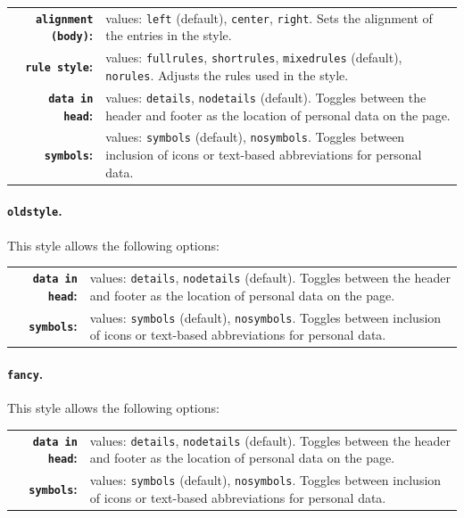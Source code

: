 \documentclass[a4paper, 11pt]{article}
\newcommand{\code}[1]{\lstinline!#1!}
\begin{document}
\begin{tabular}{r@{\hspace{2ex}}p{}}
  \textbf{\code{alignment (body)}:} & values: \code{left} (default), \code{center}, \code{right}.
  Sets the alignment of the entries in the style. \\
  \textbf{\code{rule style}:}       & values: \code{fullrules}, \code{shortrules}, \code{mixedrules} (default), \code{norules}.
  Adjusts the rules used in the style. \\
  \textbf{\code{data in head}:}     & values: \code{details}, \code{nodetails} (default).
  Toggles between the header and footer as the location of personal data on the page. \\
  \textbf{\code{symbols}:}          & values: \code{symbols} (default), \code{nosymbols}.
  Toggles between inclusion of icons or text-based abbreviations for personal data.
\end{tabular}

\paragraph{\code{oldstyle}.}
This style allows the following options:

\begin{tabular}{r@{\hspace{2ex}}p{}}
  \textbf{\code{data in head}:} & values: \code{details}, \code{nodetails} (default).
  Toggles between the header and footer as the location of personal data on the page. \\
  \textbf{\code{symbols}:}      & values: \code{symbols} (default), \code{nosymbols}.
  Toggles between inclusion of icons or text-based abbreviations for personal data.
\end{tabular}

\paragraph{\code{fancy}.}
This style allows the following options:

\begin{tabular}{r@{\hspace{2ex}}p{}}
  \textbf{\code{data in head}:} & values: \code{details}, \code{nodetails} (default).
  Toggles between the header and footer as the location of personal data on the page. \\
  \textbf{\code{symbols}:}      & values: \code{symbols} (default), \code{nosymbols}.
  Toggles between inclusion of icons or text-based abbreviations for personal data.
\end{tabular}
\end{document}
